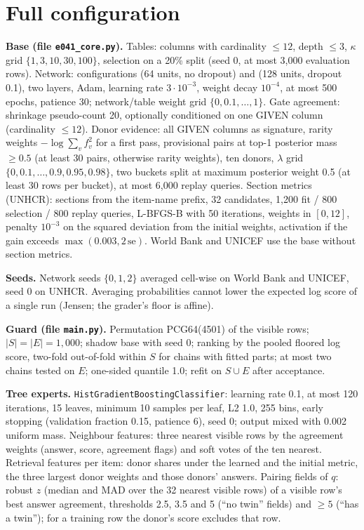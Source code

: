 \documentclass{article}
\begin{document}
\clearpage
\appendix

\section{Full configuration}
\textbf{Base (file \texttt{e041\_core.py}).} Tables: columns with cardinality $\le 12$, depth
$\le 3$, $\kappa$ grid $\{1,3,10,30,100\}$, selection on a 20\% split (seed 0, at most 3,000
evaluation rows). Network: configurations (64 units, no dropout) and (128 units, dropout
0.1), two layers, Adam, learning rate $3\cdot10^{-3}$, weight decay $10^{-4}$, at most 500
epochs, patience 30; network/table weight grid $\{0, 0.1, \dots, 1\}$. Gate agreement:
shrinkage pseudo-count 20, optionally conditioned on one GIVEN column (cardinality $\le 12$).
Donor evidence: all GIVEN columns as signature, rarity weights $-\log\sum_v f_v^2$ for a
first pass, provisional pairs at top-1 posterior mass $\ge 0.5$ (at least 30 pairs,
otherwise rarity weights), ten donors, $\lambda$ grid $\{0, 0.1, \dots, 0.9, 0.95, 0.98\}$,
two buckets split at maximum posterior weight 0.5 (at least 30 rows per bucket), at most
6,000 replay queries. Section metrics (UNHCR): sections from the item-name prefix, 32
candidates, 1,200 fit / 800 selection / 800 replay queries, L-BFGS-B with 50 iterations,
weights in $[0,12]$, penalty $10^{-3}$ on the squared deviation from the initial weights,
activation if the gain exceeds $\max(0.003, 2\,\mathrm{se})$. World Bank and UNICEF use the
base without section metrics.

\textbf{Seeds.} Network seeds $\{0,1,2\}$ averaged cell-wise on World Bank and UNICEF, seed 0
on UNHCR. Averaging probabilities cannot lower the expected log score of a single run
(Jensen; the grader's floor is affine).

\textbf{Guard (file \texttt{main.py}).} Permutation PCG64(4501) of the visible rows; $|S| =
|E| = 1{,}000$; shadow base with seed 0; ranking by the pooled floored log score, two-fold
out-of-fold within $S$ for chains with fitted parts; at most two chains tested on $E$;
one-sided quantile 1.0; refit on $S \cup E$ after acceptance.

\textbf{Tree experts.} \texttt{HistGradientBoostingClassifier}: learning rate 0.1, at most 120
iterations, 15 leaves, minimum 10 samples per leaf, L2 1.0, 255 bins, early stopping
(validation fraction 0.15, patience 6), seed 0; output mixed with 0.002 uniform mass.
Neighbour features: three nearest visible rows by the agreement weights (answer, score,
agreement flags) and soft votes of the ten nearest. Retrieval features per item: donor shares
under the learned and the initial metric, the three largest donor weights and those donors'
answers. Pairing fields of $q$: robust $z$ (median and MAD over the 32 nearest visible rows)
of a visible row's best answer agreement, thresholds 2.5, 3.5 and 5 (``no twin'' fields) and
$\ge 5$ (``has a twin''); for a training row the donor's score excludes that row.
\end{document}
